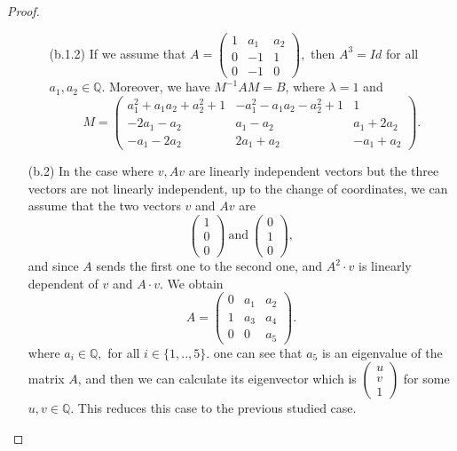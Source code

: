 \documentclass[leqno,12pt]{amsart} %
\newcommand{\Q}{\ensuremath{\mathbb{Q} }}
\begin{document}
\begin{proof}
\begin{itemize}
\begin{itemize}
\item [(b.1.2)] If we assume that
$A=\left(\begin{array}{ccc}
1 & a_{1} & a_{2} 
\\
 0 & -1 & 1 
\\
 0 & -1 & 0 
\end{array}\right)
,$ then $A^3=Id$ for all $a_{1},a_{2}\in\Q $. Moreover, we have $M^{-1}AM=B$, where $\lambda=1$ and 
\[M=\left(\begin{array}{ccc}
a_{1}^{2}+a_{1} a_{2}+a_{2}^{2}+1 & -a_{1}^{2}-a_{1} a_{2}-a_{2}^{2}+1 & 1 
\\
 -2 a_{1}-a_{2} & a_{1}-a_{2} & a_{1}+2 a_{2} 
\\
 -a_{1}-2 a_{2} & 2 a_{1}+a_{2} & -a_{1}+a_{2}
\end{array}\right).\]

    \end{itemize}
   \item [(b.2)] In the case where $v, Av$ are linearly independent vectors but the three vectors are not linearly independent, up to the change of coordinates, we can assume that the two vectors $v$ and $Av$ are 
   \[\left(\begin{array}{c}
                 1\\
                 0\\0 
            \end{array}\right)~\mathrm{and}~\left(\begin{array}{c}
                 0\\
                 1\\0 
            \end{array}\right),\] and since $A$ sends the first one to the second one, and $A^2\cdot v$ is linearly dependent of $v$ and $A\cdot v$. We obtain 
\[
A=\left(
  \begin{array}{ccc}
0 & a_{1} & a_{2} 
\\
 1 & a_{3} & a_{4} 
\\
 0 & 0 & a_{5} 
\end{array}\right).
\]
where $a_i\in\Q ,$ for all $i\in\{1,..,5\}$. one can see that $a_5$ is an eigenvalue of the matrix $A$, and then we can calculate its eigenvector which is $\left(\begin{array}{c}
                 u\\
                 v\\1 
            \end{array}\right)$ for some $u,v\in\Q $. This reduces this case to the previous studied case.
\end{itemize}
\end{proof}
 
\end{document}
